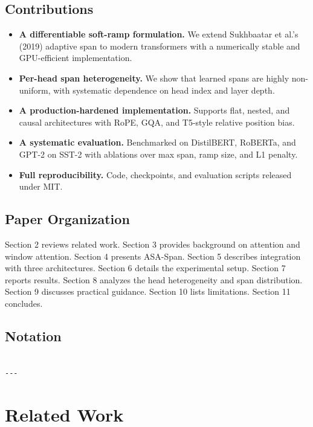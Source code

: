 \subsection{Contributions}

\begin{itemize}
\item \textbf{A differentiable soft-ramp formulation.} We extend Sukhbaatar et al.'s
  (2019) adaptive span to modern transformers with a numerically stable and
  GPU-efficient implementation.
\item \textbf{Per-head span heterogeneity.} We show that learned spans are highly
  non-uniform, with systematic dependence on head index and layer depth.
\item \textbf{A production-hardened implementation.} Supports flat, nested, and causal
  architectures with RoPE, GQA, and T5-style relative position bias.
\item \textbf{A systematic evaluation.} Benchmarked on DistilBERT, RoBERTa, and GPT-2
  on SST-2 with ablations over max span, ramp size, and L1 penalty.
\item \textbf{Full reproducibility.} Code, checkpoints, and evaluation scripts released
  under MIT.

\end{itemize}
\subsection{Paper Organization}

Section 2 reviews related work. Section 3 provides background on attention and 
window attention. Section 4 presents ASA-Span. Section 5 describes integration 
with three architectures. Section 6 details the experimental setup. Section 
7 reports results. Section 8 analyzes the head heterogeneity and span 
distribution. Section 9 discusses practical guidance. Section 10 lists 
limitations. Section 11 concludes.



\subsection{Notation}

\begin{lstlisting}

---
\end{lstlisting}


\section{Related Work}

